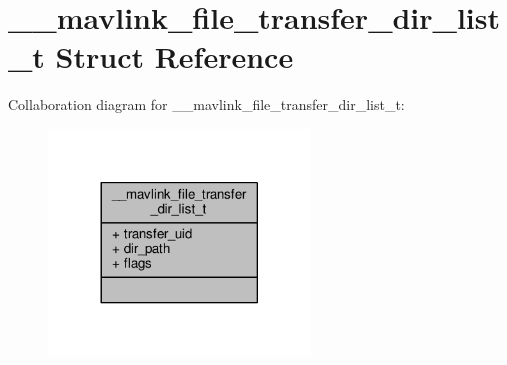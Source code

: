 \hypertarget{struct____mavlink__file__transfer__dir__list__t}{\section{\+\_\+\+\_\+mavlink\+\_\+file\+\_\+transfer\+\_\+dir\+\_\+list\+\_\+t Struct Reference}
\label{struct____mavlink__file__transfer__dir__list__t}
}


Collaboration diagram for \+\_\+\+\_\+mavlink\+\_\+file\+\_\+transfer\+\_\+dir\+\_\+list\+\_\+t\+:
\nopagebreak
\begin{figure}[H]
\begin{center}
\leavevmode
\includegraphics[width=197pt]{struct____mavlink__file__transfer__dir__list__t__coll__graph}
\end{center}
\end{figure}
